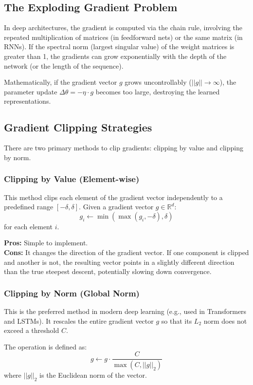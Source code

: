 \documentclass[12pt,a4paper]{report}
\begin{document}
\subsection{The Exploding Gradient Problem}
In deep architectures, the gradient is computed via the chain rule, involving the repeated multiplication of matrices (in feedforward nets) or the same matrix (in RNNs).
If the spectral norm (largest singular value) of the weight matrices is greater than 1, the gradients can grow exponentially with the depth of the network (or the length of the sequence).

Mathematically, if the gradient vector $g$ grows uncontrollably ($||g|| \to \infty$), the parameter update $\Delta \theta = -\eta \cdot g$ becomes too large, destroying the learned representations.

\subsection{Gradient Clipping Strategies}
There are two primary methods to clip gradients: clipping by value and clipping by norm.

\subsubsection{Clipping by Value (Element-wise)}
This method clips each element of the gradient vector independently to a predefined range $[-\delta, \delta]$.
Given a gradient vector $g \in \mathbb{R}^d$:
$$ g_i \leftarrow \min(\max(g_i, -\delta), \delta) $$
for each element $i$.

\textbf{Pros:} Simple to implement.\\
\textbf{Cons:} It changes the direction of the gradient vector. If one component is clipped and another is not, the resulting vector points in a slightly different direction than the true steepest descent, potentially slowing down convergence.

\subsubsection{Clipping by Norm (Global Norm)}
This is the preferred method in modern deep learning (e.g., used in Transformers and LSTMs). It rescales the entire gradient vector $g$ so that its $L_2$ norm does not exceed a threshold $C$.

The operation is defined as:
$$ g \leftarrow g \cdot \frac{C}{\max(C, ||g||_2)} $$
where $||g||_2$ is the Euclidean norm of the vector.
\end{document}
